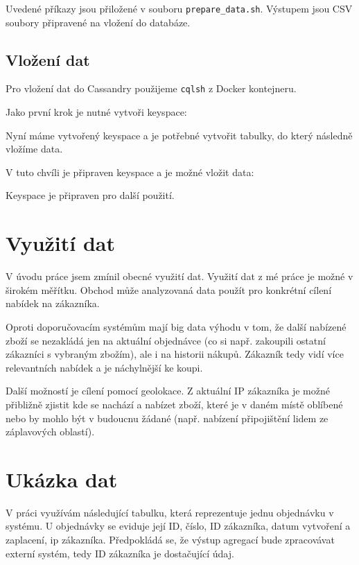 \documentclass[czech]{article}
\begin{document}
Uvedené příkazy jsou přiložené v souboru \lstinline{prepare_data.sh}. Výstupem jsou CSV soubory připravené na vložení do databáze.

\subsection{Vložení dat}

Pro vložení dat do Cassandry použijeme \lstinline{cqlsh} z Docker kontejneru.

Jako první krok je nutné vytvoři keyspace:



Nyní máme vytvořený keyspace a je potřebné vytvořit tabulky, do který následně vložíme data.



V  tuto chvíli je připraven keyspace a je možné vložit data:



Keyspace je připraven pro další použití.

\section{Využití dat}

V úvodu práce jsem zmínil obecné využití dat. Využití dat z mé práce je možné v širokém měřítku. Obchod může analyzovaná data použít pro konkrétní cílení nabídek na zákazníka.

Oproti doporučovacím systémům mají big data výhodu v tom, že další nabízené zboží se nezakládá jen na aktuální objednávce (co si např. zakoupili ostatní zákazníci s vybraným zbožím), ale i na historii nákupů. Zákazník tedy vidí více relevantních nabídek a je náchylnější ke koupi.

Další možností je cílení pomocí geolokace. Z aktuální IP zákazníka je možné přibližně zjistit kde se nachází a nabízet zboží, které je v daném místě oblíbené nebo by mohlo být v budoucnu žádané (např. nabízení připojištění lidem ze záplavových oblastí).

\section{Ukázka dat}

V práci využívám následující tabulku, která reprezentuje jednu objednávku v systému. U objednávky se eviduje její ID, číslo, ID zákazníka, datum vytvoření a zaplacení, ip zákazníka. Předpokládá se, že výstup agregací bude zpracovávat externí systém, tedy ID zákazníka je dostačující údaj.
\end{document}
